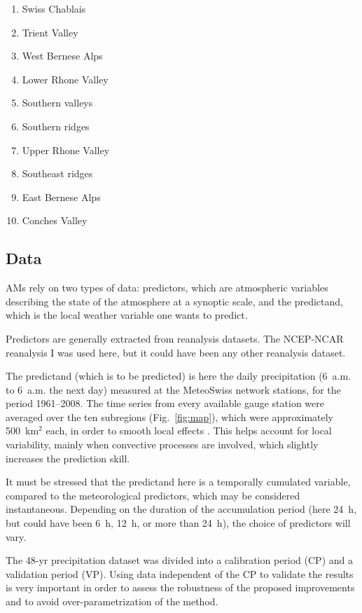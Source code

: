 \documentclass[review]{elsarticle}
\begin{document}
\begin{enumerate}
	\item Swiss Chablais
	\item Trient Valley
	\item West Bernese Alps
	\item Lower Rhone Valley
	\item Southern valleys
	\item Southern ridges
	\item Upper Rhone Valley
	\item Southeast ridges
	\item East Bernese Alps
	\item Conches Valley
\end{enumerate}


\subsection{Data}
\label{sec:data}

AMs rely on two types of data: predictors, which are atmospheric variables describing the state of the atmosphere at a synoptic scale, and the predictand, which is the local weather variable one wants to predict.

Predictors are generally extracted from reanalysis datasets. The NCEP-NCAR reanalysis I \citep[6-hourly, 17 pressure levels at a resolution of 2.5\degree, see][]{Kalnay1996} was used here, but it could have been any other reanalysis dataset.

The predictand (which is to be predicted) is here the daily precipitation (6~a.m. to 6~a.m. the next day) measured at the MeteoSwiss network stations, for the period 1961--2008. The time series from every available gauge station were averaged over the ten subregions (Fig.\ \ref{fig:map}), which were approximately 500~km$^{2}$ each, in order to smooth local effects \citep{Obled2002, Marty2012}. This helps account for local variability, mainly when convective processes are involved, which slightly increases the prediction skill.

It must be stressed that the predictand here is a temporally cumulated variable, compared to the meteorological predictors, which may be considered instantaneous. Depending on the duration of the accumulation period (here 24~h, but could have been 6~h, 12~h, or more than 24~h), the choice of predictors will vary. 

The 48-yr precipitation dataset was divided into a calibration period (CP) and a validation period (VP). Using data independent of the CP to validate the results is very important in order to assess the robustness of the proposed improvements and to avoid over-parametrization of the method.
\end{document}

